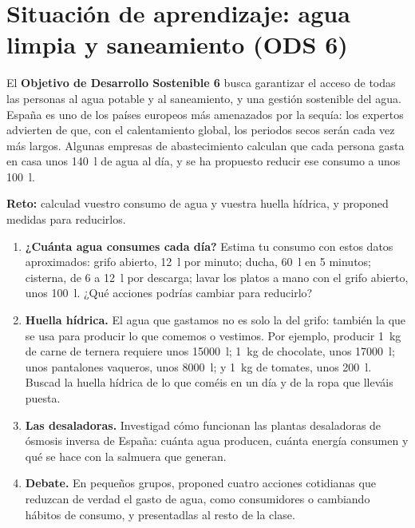 \section{Situación de aprendizaje: agua limpia y saneamiento (ODS 6)}\label{sec:ud2-ods}

El \textbf{Objetivo de Desarrollo Sostenible 6} busca garantizar el acceso de todas las personas al agua potable y al
saneamiento, y una gestión sostenible del agua. España es uno de los países europeos más amenazados por la sequía: los expertos
advierten de que, con el calentamiento global, los periodos secos serán cada vez más largos. Algunas empresas de abastecimiento
calculan que cada persona gasta en casa unos \qty{140}{\litre} de agua al día, y se ha propuesto reducir ese consumo a unos
\qty{100}{\litre}.

\begin{marker}
    \textbf{Reto:} calculad vuestro consumo de agua y vuestra huella hídrica, y proponed medidas para reducirlos.
\end{marker}

\begin{enumerate}[label=\numberballred]
    \item \textbf{¿Cuánta agua consumes cada día?} Estima tu consumo con estos datos aproximados: grifo abierto, \qty{12}{\litre}
    por minuto; ducha, \qty{60}{\litre} en 5 minutos; cisterna, de 6 a \qty{12}{\litre} por descarga; lavar los platos a mano con
    el grifo abierto, unos \qty{100}{\litre}. ¿Qué acciones podrías cambiar para reducirlo?
    \item \textbf{Huella hídrica.} El agua que gastamos no es solo la del grifo: también la que se usa para producir lo que
    comemos o vestimos. Por ejemplo, producir \qty{1}{\kilo\gram} de carne de ternera requiere unos \qty{15000}{\litre};
    \qty{1}{\kilo\gram} de chocolate, unos \qty{17000}{\litre}; unos pantalones vaqueros, unos \qty{8000}{\litre}; y
    \qty{1}{\kilo\gram} de tomates, unos \qty{200}{\litre}. Buscad la huella hídrica de lo que coméis en un día y de la ropa que
    lleváis puesta.
    \item \textbf{Las desaladoras.} Investigad cómo funcionan las plantas desaladoras de ósmosis inversa de España: cuánta agua
    producen, cuánta energía consumen y qué se hace con la salmuera que generan.
    \item \textbf{Debate.} En pequeños grupos, proponed cuatro acciones cotidianas que reduzcan de verdad el gasto de agua, como
    consumidores o cambiando hábitos de consumo, y presentadlas al resto de la clase.
\end{enumerate}
